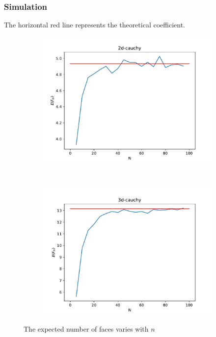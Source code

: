 \documentclass{beamer}
\begin{document}
\begin{frame}
    \frametitle{Simulation}
    The horizontal red line represents the theoretical coefficient.
    \begin{figure}
        \centering
        \begin{subfigure}[b]{0.5\linewidth}
        \includegraphics[width=\textwidth]{fig/2d-cauchy.pdf}
        \caption{}
        \label{fig:2d_cauchy}
        \end{subfigure}~
        \begin{subfigure}[b]{0.5\linewidth}
          \includegraphics[width=\textwidth]{fig/3d-cauchy.pdf}
          \caption{}
          \label{fig:3d_cauchy}
          \end{subfigure}
          \caption{The expected number of faces varies with $n$}
      \end{figure}
\end{frame}
\end{document}
